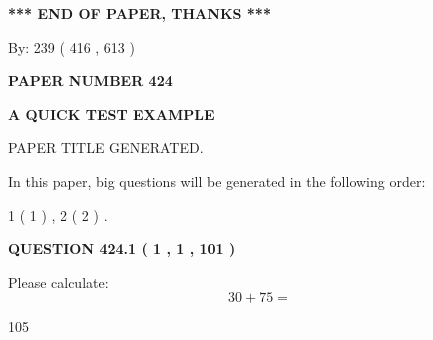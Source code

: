 \documentclass[12pt]{article}
\begin{document}
   
   
   
\vspace{1.0in} 
{\textbf{\large{ *** END OF PAPER, THANKS *** }}} 
   
   
\hspace{1.0in} By: 
 239 ( 416 ,  613 )
   
   
   
   
\newpage 
\setcounter{page}{ 
   424001 } 
   
   
   
   
 {\textbf{ \Large{ PAPER NUMBER  424  }}}
   
   
\vspace{0.2in}
   
   
   
   
   
   
   
   
 \vspace{0.2in}
{\LARGE {\textbf{ A QUICK TEST EXAMPLE}}}
   
   
 PAPER TITLE GENERATED.
   
   
   
\vspace{0.2in}
   
In this paper, big questions will be generated in the following order: 
   
   
   1 ( 1 )
 ,
   2 ( 2 )
 .
  
\vspace{0.2in}
  
{\textbf{\Large{QUESTION
424.1 
 ( 1 , 1 , 101 )
}}}
  
  
 
Please calculate:
\begin{equation}
30 +  %
75 = \nonumber
\end{equation}
 
 
 
\noindent{}
 
 

105
 
 
\noindent{}
 
 

 
 
 
\noindent{}
 
\end{document}
